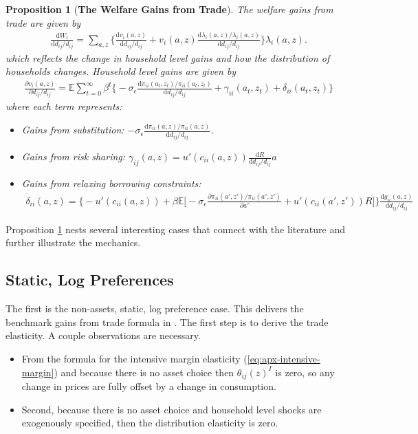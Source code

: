 \documentclass[12pt,pdftex]{article}
\newtheorem{prp}{Proposition}
\begin{document}
\begin{onehalfspacing}
\begin{prp}[\textbf{The Welfare Gains from Trade}] \label{apx-prp:gains-trade} The welfare gains from trade are given by
{\footnotesize
\begin{align}
\frac{\mathrm{d} W_{i}}{\mathrm{d} d_{ij} / d_{ij}} = \sum_{a,z} \bigg \{ \frac{\mathrm{d} v_i(a, z)}{\mathrm{d} d_{ij} / d_{ij}}  + v_{i}(a,z) \frac{\mathrm{d} \lambda_{i}(a,z)/ \lambda_{i}(a,z)}{\mathrm{d} d_{ij} / d_{ij}}  \bigg \} \lambda_{i}(a,z).
\nonumber
\end{align}
}which reflects the change in household level gains and how the distribution of households changes. Household level gains are given by
{\footnotesize
\begin{align}
\nonumber
\frac{\partial v_i(a, z)}{\partial d_{ij} / d_{ij}} = \mathbb{E} \sum_{t = 0}^{\infty} \beta^{t} \bigg \{ -\sigma_{\epsilon} \frac{\mathrm{d} \pi_{ii}(a_{t},z_{t}) / \pi_{ii}(a_{t},z_{t})}{\mathrm{d}d_{ij} / d_{ij}} + \gamma_{ii}(a_{t},z_{t}) + \delta_{ii}(a_{t},z_{t}) \bigg \}
\end{align}
}where each term represents:
\begin{itemize}
\item Gains from substitution: $-\sigma_{\epsilon} \frac{\mathrm{d} \pi_{ii}(a,z) / \pi_{ii}(a,z)}{\mathrm{d}d_{ij} / d_{ij}}$.

\item Gains from risk sharing: $\gamma_{ij}(a,z) = u'(c_{ii}(a,z))\frac{\mathrm{d} R}{\mathrm{d} d_{ij} / d_{ij}}a$

\item Gains from relaxing borrowing constraints:
\begin{align}
\nonumber
\delta_{ii}(a,z) = \bigg \{- u'(c_{ii}(a,z)) + \beta \mathbb{E} \big [-\sigma_{\epsilon} \frac{\partial \pi_{ii}(a',z') / \pi_{ii}(a',z')}{\partial a'} + u'(c_{ii}(a',z'))R \big ] \bigg \}\frac{\mathrm{d} g_{ii}(a,z)}{\mathrm{d} d_{ij} / d_{ij}}
\end{align}
\end{itemize}
\end{prp}
Proposition \ref{apx-prp:gains-trade} nests several interesting cases that connect with the literature and further illustrate the mechanics.

\subsection{Static, Log Preferences}

The first is the non-assets, static, log preference case. This delivers the benchmark gains from trade formula in \citet{arkolakis2012new}. The first step is to derive the trade elasticity. A couple observations are necessary.
\begin{itemize}
\item From the formula for the intensive margin elasticity (\ref{eq:apx-intensive-margin}) and because there is no asset choice then $\theta_{ij}(z)^I$ is zero, so any change in prices are fully offset by a change in consumption. 
\item Second, because there is no asset choice and household level shocks are exogenously specified, then the distribution elasticity is zero. 


\end{itemize}
\end{onehalfspacing}
\end{document}
